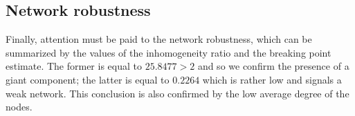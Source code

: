 \documentclass[12pt,a4paper]{article}
\begin{document}
\subsection*{Network robustness}
Finally, attention must be paid to the network robustness, which can be summarized by the values of the inhomogeneity ratio and the breaking point estimate. The former is equal to $25.8477 > 2$ and so we confirm the presence of a giant component; the latter is equal to $0.2264$ which is rather low and signals a weak network. This conclusion is also confirmed by the low average degree of the nodes.

 
 
\end{document}
